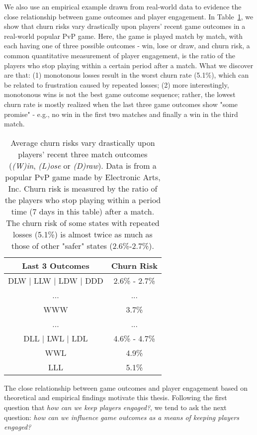 We also use an empirical example drawn from real-world data to evidence the close relationship between game outcomes and player engagement. In Table~\ref{tab:churnrate}, we show that churn risks vary drastically upon players' recent game outcomes in a real-world popular PvP game. Here, the game is played match by match, with each having one of three possible outcomes - win, lose or draw, and churn risk, a common quantitative measurement of player engagement, is the ratio of the players who stop playing within a certain period after a match. What we discover are that: (1) monotonous losses result in the worst churn rate (5.1\%), which can be related to frustration caused by repeated losses; (2) more interestingly, monotonous wins is not the best game outcome sequence; rather, the lowest churn rate is mostly realized when the last three game outcomes show "some promise" - e.g., no win in the first two matches and finally a win in the third match.                   

\begin{table}
\centering
\caption{
Average churn risks vary drastically upon players' recent three match outcomes (\emph{(W)in}, \emph{(L)ose} or \emph{(D)raw}). Data is from a popular PvP game made by Electronic Arts, Inc. Churn risk is measured by the ratio of the players who stop playing within a period time (7 days in this table) after a match. The churn risk of some states with repeated losses (5.1\%) is almost twice as much as those of other "safer" states (2.6\%-2.7\%).
} \label{tab:churnrate}
\vspace{2mm}
\begin{tabular}{|c|c|}
\hline
Last 3 Outcomes & Churn Risk                      \\ \hline
DLW $|$ LLW $|$ LDW $|$ DDD      &  2.6\% - 2.7\%        \\
... & ...  \\
WWW   &  3.7\% \\
... & ... \\
DLL $|$ LWL $|$ LDL  &  4.6\% - 4.7\%  \\
WWL & 4.9\% \\
LLL & 5.1\% \\
\hline
\end{tabular}
\end{table}

The close relationship between game outcomes and player engagement based on theoretical and empirical findings motivate this thesis. Following the first question that \textit{how can we keep players engaged?}, we tend to ask the next question: \textit{how can we influence game outcomes as a means of keeping players engaged?}

